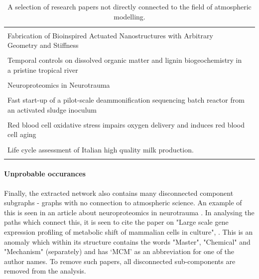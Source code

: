 \begin{table}[H]
\begin{center}
\begin{tabular}{ p{}|l }
 \hline
   & \\
 Fabrication of Bioinspired Actuated Nanostructures with Arbitrary Geometry and Stiffness & \citep{nano} \\ \\
 Temporal controls on dissolved organic matter and lignin biogeochemistry in a pristine tropical river  & \citep{biogeo} \\ \\
Neuroproteomics in Neurotrauma & \citep{neurotrauma}\\ \\
%
Fast start-up of a pilot-scale deammonification sequencing batch reactor from an activated sludge inoculum & \citep{pilot} \\ \\
Red blood cell oxidative stress impairs oxygen  delivery and induces red blood cell aging & \citep{blood} \\ \\
%
Life cycle assessment of Italian high quality milk production. & \citep{milk}\\ \\
%
 \hline
\end{tabular}
\end{center}

\caption{A selection of research papers not directly connected to the field of atmospheric modelling.}
\label{table:otherpapers}
\end{table}



\paragraph*{Unprobable occurances}
Finally, the extracted network also contains many disconnected component subgraphs - graphs with no connection to atmospheric science. An example of this is seen in an article about neuroproteomics in neurotrauma \citep{neurotrauma}. In analysing the paths which connect this, it is seen to cite the paper on "Large scale gene expression profiling of metabolic shift of mammalian cells in culture", \citep{neuro2}. This is an anomaly which within its structure contains the words "Master", "Chemical" and "Mechanism" (separately) and has `MCM' as an abbreviation for one of the author names. To remove such papers, all disconnected sub-components are removed from the analysis. 





